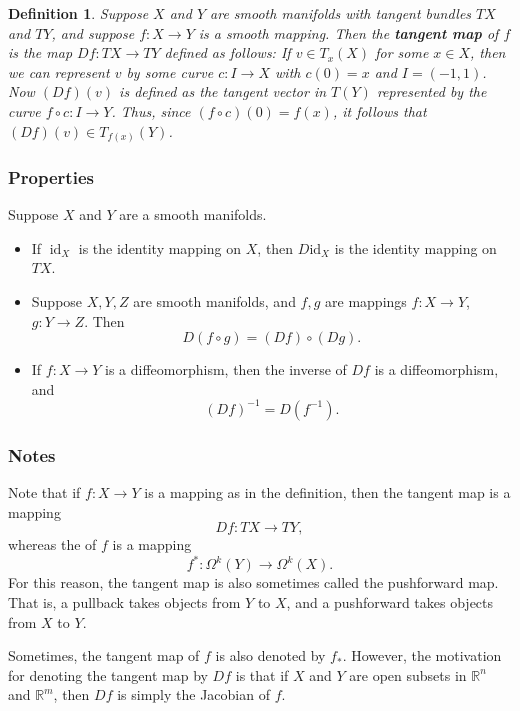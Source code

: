 \documentclass[12pt]{article}
\newcommand{\sR}[0]{\mathbb{R}}
\newtheorem{defn}{Definition}
\begin{document}
\begin{defn}
Suppose $X$ and $Y$ are smooth manifolds with tangent bundles
$TX$ and $TY$, and suppose $f:X\to Y$
is a smooth mapping. Then the {\bf tangent map} of $f$ is the map
$Df\colon TX\to TY$ defined as follows: If $v\in T_x(X)$ for some 
$x\in X$, then
we can represent $v$ by some curve 
$c\colon I \to X$ with $c(0)=x$ and $I=(-1,1)$. 
Now $(Df)(v)$ is defined as the tangent vector in $T(Y)$ 
represented by the curve $f\circ c\colon I \to Y$. Thus,
since $(f\circ c)(0)=f(x)$, it follows that $(Df)(v)\in T_{f(x)}(Y)$.
\end{defn}

\subsubsection*{Properties}
Suppose $X$ and $Y$ are a smooth manifolds.
\begin{itemize}
\item If $\operatorname{id}_X$ is the identity mapping on $X$, then 
$D\mbox{id}_X$ is the identity mapping on $TX$. 
\item Suppose $X,Y,Z$ are smooth manifolds, and $f,g$ are mappings
$f\colon X\to Y$, $g\colon Y\to Z$. Then 
$$ 
  D(f\circ g) = (Df)\circ (Dg).
$$
\item If $f\colon X\to Y$ is a diffeomorphism, then the inverse of $Df$ is a diffeomorphism,
and 
$$ 
  (Df)^{-1}=D(f^{-1}).
$$
\end{itemize}

\subsubsection*{Notes}
Note that if $f\colon X\to Y$ is a mapping as in 
the definition, then the tangent map is
a mapping 
$$
 Df\colon  TX\to TY,
$$
whereas the  of $f$ is a mapping
$$
  f^\ast\colon \Omega^k(Y)\to \Omega^k(X).
$$
For this reason, the tangent map is also sometimes called the pushforward map.
That is, a pullback takes objects from $Y$ to $X$, and 
a pushforward  takes objects from $X$ to $Y$.

Sometimes, the tangent map of $f$ is also denoted by $f_\ast$. However,
the motivation for denoting the tangent map by $Df$ is that if $X$ and $Y$
are open subsets in $\sR^n$ and $\sR^m$, then $Df$ is simply
the Jacobian of $f$.
\end{document}
